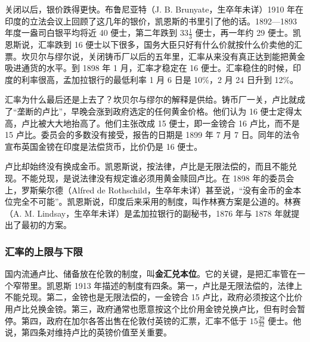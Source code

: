 关闭以后，银价跌得更快。布鲁尼亚特（J. B. Brunyate，生卒年未详）1910 年在印度的立法会议上回顾了这几年的银价，凯恩斯的书里引了他的话\cite{keynes1913}。1892—1893 年度一盎司白银平均将近 40 便士，第二年跌到 $33\tfrac13$ 便士，再一年约 29 便士\cite{keynes1913}。凯恩斯说，汇率跌到 16 便士以下很多，国务大臣只好有什么价就按什么价卖他的汇票\cite{keynes1913}。坎贝尔与缪尔说，关闭铸币厂以后的五年里，汇率从来没有真正达到能把黄金吸进通货的水平\cite{fowler1899}。到 1898 年 1 月，汇率才稳定在 16 便士\cite{keynes1913}。汇率稳住的时候，印度的利率很高，孟加拉银行的最低利率 1 月 6 日是 10\%，2 月 24 日升到 12\%\cite{fowler1899}。

汇率为什么最后还是上去了？坎贝尔与缪尔的解释是供给。铸币厂一关，卢比就成了“垄断的卢比”，早晚会涨到政府选定的任何黄金价格\cite{fowler1899}。他们认为 16 便士定得太高，卢比被大大地抬高了\cite{fowler1899}。他们主张改成 15 便士，即一金镑合 16 卢比，而不是 15 卢比\cite{fowler1899}。委员会的多数没有接受，报告的日期是 1899 年 7 月 7 日\cite{fowler1899}。同年的法令宣布英国金镑在印度是法偿货币，比价仍是 16 便士\cite{keynes1913}。

卢比却始终没有换成金币。凯恩斯说，按法律，卢比是无限法偿的，而且不能兑现\cite{keynes1913}。不能兑现，是说法律没有规定谁必须用黄金赎回卢比。在 1898 年的委员会上，罗斯柴尔德（Alfred de Rothschild，生卒年未详）甚至说，“没有金币的金本位完全不可能”\cite{keynes1913}。凯恩斯说，印度后来采用的制度，叫作林赛方案是公道的\cite{keynes1913}。林赛（A. M. Lindsay，生卒年未详）是孟加拉银行的副秘书，1876 年与 1878 年就提出了最初的方案\cite{keynes1913}。

\subsubsection{汇率的上限与下限}
国内流通卢比、储备放在伦敦的制度，叫\textbf{金汇兑本位}。它的关键，是把汇率管在一个窄带里。凯恩斯 1913 年描述的制度有四条。第一，卢比是无限法偿的，法律上不能兑现\cite{keynes1913}。第二，金镑也是无限法偿的，一金镑合 15 卢比，政府必须按这个比价用卢比兑换金镑\cite{keynes1913}。第三，政府通常也愿意按这个比价用金镑兑换卢比，但有时会暂停\cite{keynes1913}。第四，政府在加尔各答出售在伦敦付英镑的汇票，汇率不低于 $15\tfrac{29}{32}$ 便士\cite{keynes1913}。他说，第四条对维持卢比的英镑价值至关重要\cite{keynes1913}。


